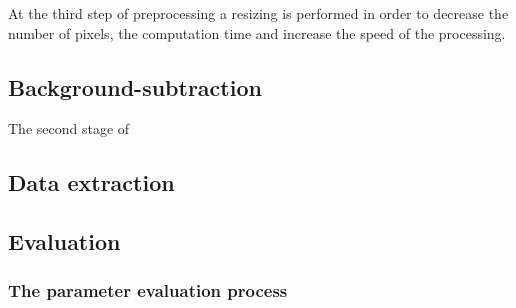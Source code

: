 At the third step of preprocessing a resizing is performed in order to decrease the number of pixels, the computation time and increase the speed of the processing.
\subsection{Background-subtraction}
The second stage of
\subsection{Data extraction}

\subsection{Evaluation}
\subsubsection{The parameter evaluation process}




